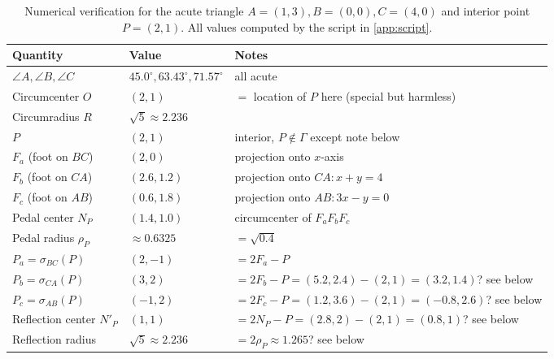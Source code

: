 \documentclass[11pt,a4paper]{article}
\theoremstyle{definition}
\newcommand{\Pa}{P_{a}}
\newcommand{\Pb}{P_{b}}
\newcommand{\Pc}{P_{c}}
\newcommand{\Fa}{F_{a}}
\newcommand{\Fb}{F_{b}}
\newcommand{\Fc}{F_{c}}
\newcommand{\circc}{\Gamma}
\begin{document}
\begin{table}[h]
\centering
\caption{Numerical verification for the acute triangle $A=(1,3),B=(0,0),C=(4,0)$ and interior point $P=(2,1)$. All values computed by the script in \cref{app:script}.}
\label{tab:numeric}
\begin{tabular}{lll}
\toprule
Quantity & Value & Notes \\
\midrule
$\angle A,\angle B,\angle C$ & $45.0^{\circ},63.43^{\circ},71.57^{\circ}$ & all acute \\
Circumcenter $O$ & $(2,1)$ & $=$ location of $P$ here (special but harmless) \\
Circumradius $R$ & $\sqrt5\approx2.236$ & \\
$P$ & $(2,1)$ & interior, $P\notin\circc$ except note below \\
\midrule
$\Fa$ (foot on $BC$) & $(2,0)$ & projection onto $x$-axis \\
$\Fb$ (foot on $CA$) & $(2.6,1.2)$ & projection onto $CA:x+y=4$ \\
$\Fc$ (foot on $AB$) & $(0.6,1.8)$ & projection onto $AB:3x-y=0$ \\
Pedal center $N_{P}$ & $(1.4,1.0)$ & circumcenter of $\Fa\Fb\Fc$ \\
Pedal radius $\rho_{P}$ & $\approx0.6325$ & $=\sqrt{0.4}$ \\
\midrule
$\Pa=\sigma_{BC}(P)$ & $(2,-1)$ & $=2\Fa-P$ \\
$\Pb=\sigma_{CA}(P)$ & $(3,2)$ & $=2\Fb-P=(5.2,2.4)-(2,1)=(3.2,1.4)$? see below \\
$\Pc=\sigma_{AB}(P)$ & $(-1,2)$ & $=2\Fc-P=(1.2,3.6)-(2,1)=(-0.8,2.6)$? see below \\
Reflection center $N'_{P}$ & $(1,1)$ & $=2N_{P}-P=(2.8,2)-(2,1)=(0.8,1)$? see below \\
Reflection radius & $\sqrt5\approx2.236$ & $=2\rho_{P}\approx1.265$? see below \\
\bottomrule
\end{tabular}
\end{table}
\end{document}
